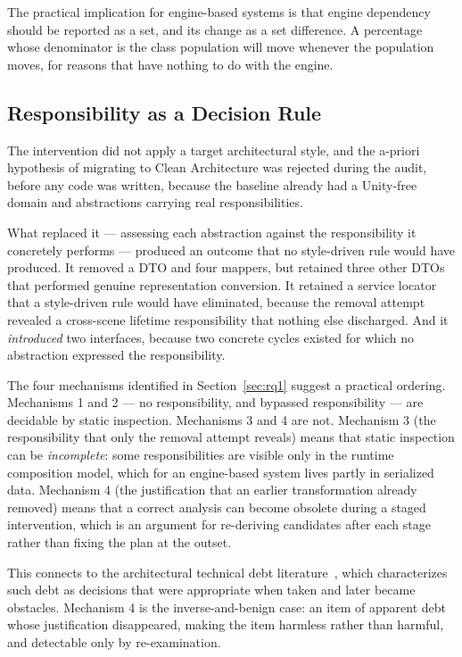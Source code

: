 \documentclass{sbc2019}%
\begin{document}
The practical implication for engine-based systems is that engine dependency
should be reported as a set, and its change as a set difference. A percentage
whose denominator is the class population will move whenever the population
moves, for reasons that have nothing to do with the engine.

\subsection{Responsibility as a Decision Rule}

The intervention did not apply a target architectural style, and the a-priori
hypothesis of migrating to Clean Architecture was rejected during the audit,
before any code was written, because the baseline already had a Unity-free
domain and abstractions carrying real responsibilities.

What replaced it --- assessing each abstraction against the responsibility it
concretely performs --- produced an outcome that no style-driven rule would have
produced. It removed a DTO and four mappers, but retained three other DTOs that
performed genuine representation conversion. It retained a service locator that
a style-driven rule would have eliminated, because the removal attempt revealed a
cross-scene lifetime responsibility that nothing else discharged. And it
\emph{introduced} two interfaces, because two concrete cycles existed for which
no abstraction expressed the responsibility.

The four mechanisms identified in Section~\ref{sec:rq1} suggest a practical
ordering. Mechanisms 1 and 2 --- no responsibility, and bypassed responsibility
--- are decidable by static inspection. Mechanisms 3 and 4 are not. Mechanism 3
(the responsibility that only the removal attempt reveals) means that static
inspection can be \emph{incomplete}: some responsibilities are visible only in
the runtime composition model, which for an engine-based system lives partly in
serialized data. Mechanism 4 (the justification that an earlier transformation
already removed) means that a correct analysis can become obsolete during a
staged intervention, which is an argument for re-deriving candidates after each
stage rather than fixing the plan at the outset.

This connects to the architectural technical debt literature~\cite{verdecchia2020,verdecchia2021},
which characterizes such debt as decisions
that were appropriate when taken and later became obstacles. Mechanism 4 is the
inverse-and-benign case: an item of apparent debt whose justification
disappeared, making the item harmless rather than harmful, and detectable only
by re-examination.
\end{document}
